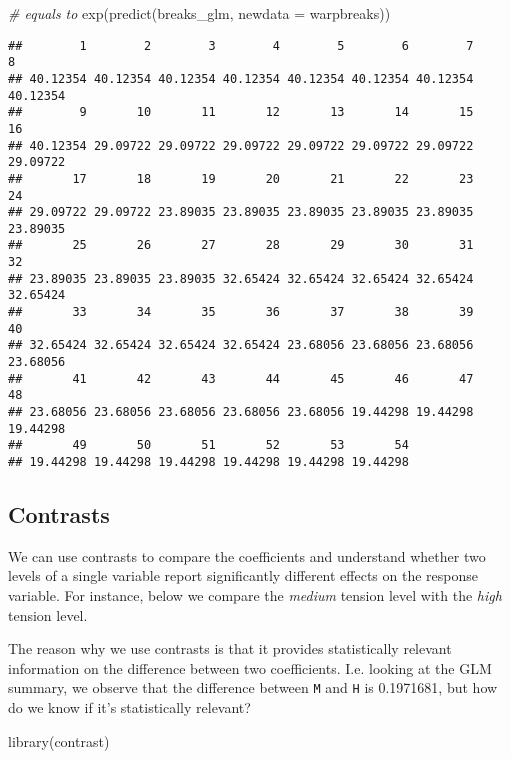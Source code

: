 \documentclass[
  oneside]{book}
\newenvironment{Shaded}{\begin{snugshade}}{\end{snugshade}}
\newcommand{\AttributeTok}[1]{\textcolor[rgb]{0.77,0.63,0.00}{#1}}
\newcommand{\CommentTok}[1]{\textcolor[rgb]{0.56,0.35,0.01}{\textit{#1}}}
\newcommand{\FunctionTok}[1]{\textcolor[rgb]{0.00,0.00,0.00}{#1}}
\newcommand{\NormalTok}[1]{#1}
\begin{document}
\begin{Shaded}
\begin{Highlighting}[]
\CommentTok{\# equals to}
\FunctionTok{exp}\NormalTok{(}\FunctionTok{predict}\NormalTok{(breaks\_glm, }\AttributeTok{newdata =}\NormalTok{ warpbreaks))}
\end{Highlighting}
\end{Shaded}

\begin{verbatim}
##        1        2        3        4        5        6        7        8 
## 40.12354 40.12354 40.12354 40.12354 40.12354 40.12354 40.12354 40.12354 
##        9       10       11       12       13       14       15       16 
## 40.12354 29.09722 29.09722 29.09722 29.09722 29.09722 29.09722 29.09722 
##       17       18       19       20       21       22       23       24 
## 29.09722 29.09722 23.89035 23.89035 23.89035 23.89035 23.89035 23.89035 
##       25       26       27       28       29       30       31       32 
## 23.89035 23.89035 23.89035 32.65424 32.65424 32.65424 32.65424 32.65424 
##       33       34       35       36       37       38       39       40 
## 32.65424 32.65424 32.65424 32.65424 23.68056 23.68056 23.68056 23.68056 
##       41       42       43       44       45       46       47       48 
## 23.68056 23.68056 23.68056 23.68056 23.68056 19.44298 19.44298 19.44298 
##       49       50       51       52       53       54 
## 19.44298 19.44298 19.44298 19.44298 19.44298 19.44298
\end{verbatim}

\hypertarget{contrasts}{%
\subsection{Contrasts}\label{contrasts}}

We can use contrasts to compare the coefficients and
understand whether two levels of a single variable report
significantly different effects on the response variable.
For instance, below we compare the \emph{medium} tension level
with the \emph{high} tension level.

The reason why we use contrasts is that it provides
statistically relevant information on the difference between
two coefficients.
I.e. looking at the GLM summary, we observe that the difference
between \texttt{M} and \texttt{H} is 0.1971681,
but how do we know if it's statistically relevant?

\begin{Shaded}
\begin{Highlighting}[]
\FunctionTok{library}\NormalTok{(contrast)}
\end{Highlighting}
\end{Shaded}
\end{document}
